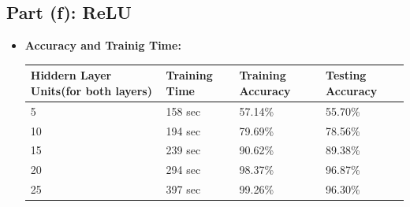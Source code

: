 \documentclass[a4 paper]{article}
\begin{document}

\subsection*{Part (f): ReLU}
\begin{itemize}
\item \textbf{Accuracy and Trainig Time:}

\hskip1.0cm\begin{tabular}{ |p{2.7cm}||p{2.5cm}|p{3.3cm}|p{3.3cm}|}
	 \hline
	 \hline \textbf{Hiddern Layer Units(for both layers)} & \textbf{Training Time} & \textbf{Training Accuracy} & \textbf{Testing Accuracy}\\
	 \hline
	 5 &  158 sec & 57.14\% &  55.70\% \\
	 10 & 194 sec & 79.69\% &  78.56\% \\
	 15 & 239 sec & 90.62\% &  89.38\% \\
	 20 & 294 sec & 98.37\% &  96.87\% \\
	 25 & 397 sec & 99.26\% &  96.30\% \\
	 \hline
\end{tabular}

\begin{figure}[H]
\centering
	\begin{floatrow}
	\hspace*{-0.9in}
\end{floatrow}
\end{figure}



\end{itemize}
\end{document}
